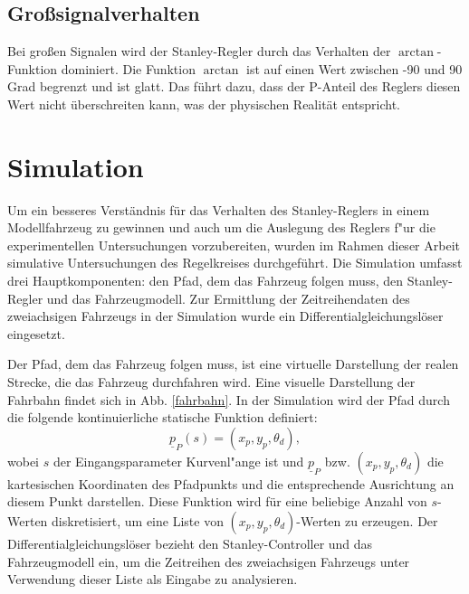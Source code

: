 \documentclass[arbeit=studie,oneside,BCOR=12mm]{ArbeitRST}
\begin{document}
\subsection{Gro{\ss}signalverhalten}

Bei großen Signalen wird der Stanley-Regler durch das Verhalten der
$\arctan$-Funktion dominiert. Die Funktion $\arctan$ ist auf einen Wert zwischen
-90 und 90 Grad begrenzt und ist glatt. Das führt dazu, dass der P-Anteil des Reglers
diesen Wert nicht überschreiten kann, was der physischen Realität entspricht.

\section{Simulation}

Um ein besseres Verständnis für das Verhalten des Stanley-Reglers in einem
Modellfahrzeug zu gewinnen und auch um die Auslegung des Reglers f"ur die experimentellen
Untersuchungen vorzubereiten, wurden im Rahmen dieser Arbeit simulative Untersuchungen
des Regelkreises durchgeführt. Die Simulation umfasst drei Hauptkomponenten: den
Pfad, dem das Fahrzeug folgen muss, den Stanley-Regler und das Fahrzeugmodell.
Zur Ermittlung der Zeitreihendaten des zweiachsigen Fahrzeugs in der
Simulation wurde ein Differentialgleichungslöser eingesetzt.

Der Pfad, dem das Fahrzeug folgen muss, ist eine virtuelle Darstellung der
realen Strecke, die das Fahrzeug durchfahren wird. Eine visuelle
Darstellung der Fahrbahn findet sich in Abb. \ref{fahrbahn}. In der Simulation wird der
Pfad durch die folgende kontinuierliche statische Funktion definiert:
\begin{equation}
        \underline{p}_P(s) = (x_p, y_p, \theta_d),
\end{equation}
wobei $s$ der Eingangsparameter Kurvenl"ange ist
und $\underline{p}_P$ bzw. $(x_p, y_p, \theta_d)$ die kartesischen Koordinaten des Pfadpunkts und die
entsprechende Ausrichtung an diesem Punkt darstellen. Diese Funktion wird für
eine beliebige Anzahl von $s$-Werten diskretisiert, um eine Liste von $(x_p, y_p,
\theta_d)$-Werten zu erzeugen. Der Differentialgleichungslöser bezieht den
Stanley-Controller und das Fahrzeugmodell ein, um die Zeitreihen des
zweiachsigen Fahrzeugs unter Verwendung dieser Liste als Eingabe zu
analysieren.
\end{document}
